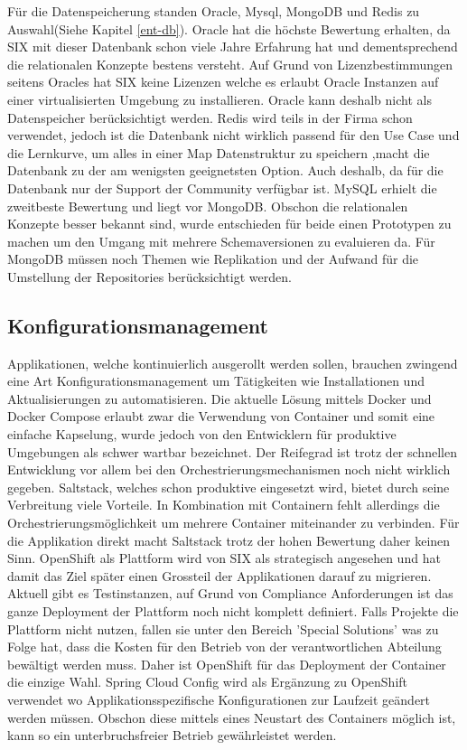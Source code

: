 Für die Datenspeicherung standen Oracle, Mysql, MongoDB und Redis zu Auswahl(Siehe Kapitel \ref{ent-db}). Oracle hat die höchste Bewertung erhalten, da SIX mit dieser Datenbank schon viele Jahre Erfahrung hat und dementsprechend die relationalen Konzepte bestens versteht. Auf Grund von Lizenzbestimmungen seitens Oracles hat SIX keine Lizenzen welche es erlaubt Oracle Instanzen auf einer virtualisierten Umgebung zu installieren. Oracle kann deshalb nicht als Datenspeicher berücksichtigt werden.\newline
Redis wird teils in der Firma schon verwendet, jedoch ist die Datenbank nicht wirklich passend für den Use Case und die Lernkurve, um alles in einer Map Datenstruktur zu speichern ,macht die Datenbank zu der am wenigsten geeignetsten Option. Auch deshalb, da für die Datenbank nur der Support der Community verfügbar ist.\newline
MySQL erhielt die zweitbeste Bewertung und liegt vor MongoDB. Obschon die relationalen Konzepte besser bekannt sind, wurde entschieden für beide einen Prototypen zu machen um den Umgang mit mehrere Schemaversionen zu evaluieren da. Für MongoDB müssen noch Themen wie Replikation und der Aufwand für die Umstellung der Repositories berücksichtigt werden.

\subsection{Konfigurationsmanagement}

Applikationen, welche kontinuierlich ausgerollt werden sollen, brauchen zwingend eine Art Konfigurationsmanagement um Tätigkeiten wie Installationen und Aktualisierungen zu automatisieren. Die aktuelle Lösung mittels Docker und Docker Compose erlaubt zwar die Verwendung von Container und somit eine einfache Kapselung, wurde jedoch von den Entwicklern für produktive Umgebungen als schwer wartbar bezeichnet. Der Reifegrad ist trotz der schnellen Entwicklung vor allem bei den Orchestrierungsmechanismen noch nicht wirklich gegeben.\newline
Saltstack, welches schon produktive eingesetzt wird, bietet durch seine Verbreitung viele Vorteile. In Kombination mit Containern fehlt allerdings die Orchestrierungsmöglichkeit um mehrere Container miteinander zu verbinden. Für die Applikation direkt macht Saltstack trotz der hohen Bewertung daher keinen Sinn.\newline
OpenShift als Plattform wird von SIX als strategisch angesehen und hat damit das Ziel später einen Grossteil der Applikationen darauf zu migrieren. Aktuell gibt es Testinstanzen, auf Grund von Compliance Anforderungen ist das ganze Deployment der Plattform noch nicht komplett definiert. Falls Projekte die Plattform nicht nutzen, fallen sie unter den Bereich 'Special Solutions' was zu Folge hat, dass die Kosten für den Betrieb von der verantwortlichen Abteilung bewältigt werden muss. Daher ist OpenShift für das Deployment der Container die einzige Wahl.
Spring Cloud Config wird als Ergänzung zu OpenShift verwendet wo Applikationsspezifische Konfigurationen zur Laufzeit geändert werden müssen. Obschon diese mittels eines Neustart des Containers möglich ist, kann so ein unterbruchsfreier Betrieb gewährleistet werden.

